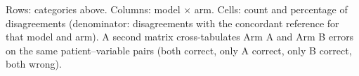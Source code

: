 \begin{resultspending}[title={Error matrix (RESULTS\_PENDING)}]
Rows: categories above. Columns: model $\times$ arm. Cells: count and percentage of disagreements (denominator:
disagreements with the concordant reference for that model and arm). A second matrix cross-tabulates Arm A and Arm B
errors on the same patient--variable pairs (both correct, only A correct, only B correct, both wrong).
\end{resultspending}
